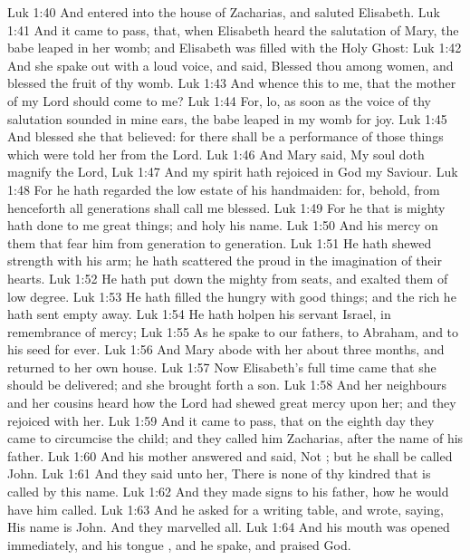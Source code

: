\vs Luk 1:40 And entered into the house of Zacharias, and saluted Elisabeth.
\vs Luk 1:41 And it came to pass, that, when Elisabeth heard the salutation of Mary, the babe leaped in her womb; and Elisabeth was filled with the Holy Ghost:
\vs Luk 1:42 And she spake out with a loud voice, and said, Blessed  thou among women, and blessed  the fruit of thy womb.
\vs Luk 1:43 And whence  this to me, that the mother of my Lord should come to me?
\vs Luk 1:44 For, lo, as soon as the voice of thy salutation sounded in mine ears, the babe leaped in my womb for joy.
\vs Luk 1:45 And blessed  she that believed: for there shall be a performance of those things which were told her from the Lord.
\vs Luk 1:46 And Mary said, My soul doth magnify the Lord,
\vs Luk 1:47 And my spirit hath rejoiced in God my Saviour.
\vs Luk 1:48 For he hath regarded the low estate of his handmaiden: for, behold, from henceforth all generations shall call me blessed.
\vs Luk 1:49 For he that is mighty hath done to me great things; and holy  his name.
\vs Luk 1:50 And his mercy  on them that fear him from generation to generation.
\vs Luk 1:51 He hath shewed strength with his arm; he hath scattered the proud in the imagination of their hearts.
\vs Luk 1:52 He hath put down the mighty from  seats, and exalted them of low degree.
\vs Luk 1:53 He hath filled the hungry with good things; and the rich he hath sent empty away.
\vs Luk 1:54 He hath holpen his servant Israel, in remembrance of  mercy;
\vs Luk 1:55 As he spake to our fathers, to Abraham, and to his seed for ever.
\vs Luk 1:56 And Mary abode with her about three months, and returned to her own house.
\vs Luk 1:57 Now Elisabeth's full time came that she should be delivered; and she brought forth a son.
\vs Luk 1:58 And her neighbours and her cousins heard how the Lord had shewed great mercy upon her; and they rejoiced with her.
\vs Luk 1:59 And it came to pass, that on the eighth day they came to circumcise the child; and they called him Zacharias, after the name of his father.
\vs Luk 1:60 And his mother answered and said, Not ; but he shall be called John.
\vs Luk 1:61 And they said unto her, There is none of thy kindred that is called by this name.
\vs Luk 1:62 And they made signs to his father, how he would have him called.
\vs Luk 1:63 And he asked for a writing table, and wrote, saying, His name is John. And they marvelled all.
\vs Luk 1:64 And his mouth was opened immediately, and his tongue , and he spake, and praised God.
